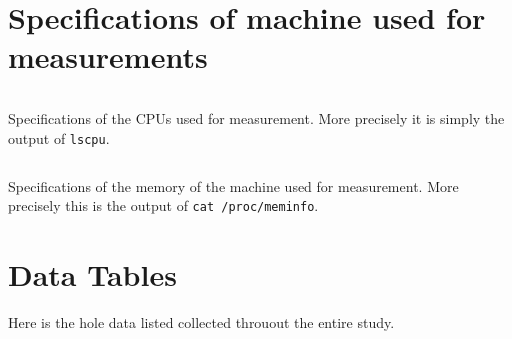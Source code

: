 \section{Specifications of machine used for measurements}
\begin{code}
    \captionsetup{type=table}
    \inputminted{text}{gfx/ZeusLscpu.log}
    \caption[Specifications of the CPUs used for measurement]{
        Specifications of the CPUs used for measurement.
        More precisely it is simply the output of \texttt{lscpu}.
    }
    \label{tab:lscpu}
\end{code}
\begin{code}
    \captionsetup{type=table}
    \inputminted{text}{gfx/ZeusMeminfo.log}
    \caption[Specifications of the memory of the machine used for measurement]{
        Specifications of the memory of the machine used for measurement.
        More precisely this is the output of \texttt{cat /proc/meminfo}.
    }
    \label{tab:meminfo}
\end{code}

\section{Data Tables}
Here is the hole data listed collected throuout the entire study.

